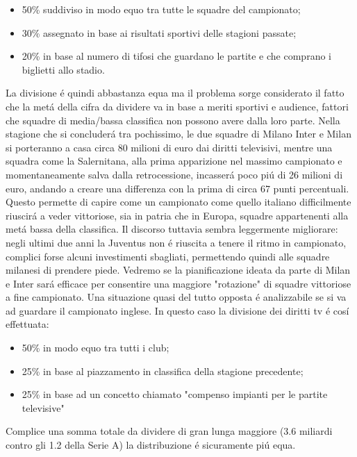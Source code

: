 \documentclass[
    corpo=12pt,
    oneside,
    evenboxes,
    tipotesi=triennale,
    stile=classica,
    oldstyle,
    autoretitolo,
    greek,
]{toptesi}
\begin{document}
\begin{interlinea}{1.5}
\begin{itemize}
    \item 50\% suddiviso in modo equo tra tutte le squadre del campionato;
    \item 30\% assegnato in base ai risultati sportivi delle stagioni passate;
    \item 20\% in base al numero di tifosi che guardano le partite e che comprano i biglietti allo stadio.
\end{itemize}
La divisione \'e quindi abbastanza equa ma il problema sorge considerato il fatto che la met\'a della cifra da dividere
va in base a meriti sportivi e audience, fattori che squadre di media/bassa classifica non possono avere dalla loro parte.
Nella stagione che si concluder\'a tra pochissimo, le due squadre di Milano Inter
e Milan si porteranno a casa circa 80 milioni di euro dai diritti televisivi, mentre una squadra come la Salernitana, alla prima apparizione 
nel massimo campionato e momentaneamente salva dalla retrocessione, incasser\'a poco pi\'u di 26 milioni di euro, andando a creare una differenza con la prima
di circa 67 punti percentuali. Questo permette di capire come un campionato come quello italiano difficilmente riuscir\'a a veder vittoriose,
sia in patria che in Europa, squadre appartenenti alla met\'a bassa della classifica. Il discorso tuttavia sembra leggermente migliorare:
negli ultimi due anni la Juventus non \'e riuscita a tenere il ritmo in campionato, complici forse alcuni investimenti sbagliati, permettendo 
quindi alle squadre milanesi di prendere piede. Vedremo se la pianificazione ideata da parte di Milan e Inter sar\'a efficace per consentire
una maggiore "rotazione" di squadre vittoriose a fine campionato.\newline
Una situazione quasi del tutto opposta \'e analizzabile se si va ad guardare il campionato inglese. In questo caso la divisione dei diritti tv \'e cos\'i effettuata:
\begin{itemize}
    \item 50\% in modo equo tra tutti i club;
    \item 25\% in base al piazzamento in classifica della stagione precedente;
    \item 25\% in base ad un concetto chiamato "compenso impianti per le partite televisive"
\end{itemize}
Complice una somma totale da dividere di gran lunga maggiore (3.6 miliardi contro gli 1.2 della Serie A) la distribuzione \'e sicuramente pi\'u equa.
\begin{figure}

\end{figure}
\end{interlinea}
\end{document}
